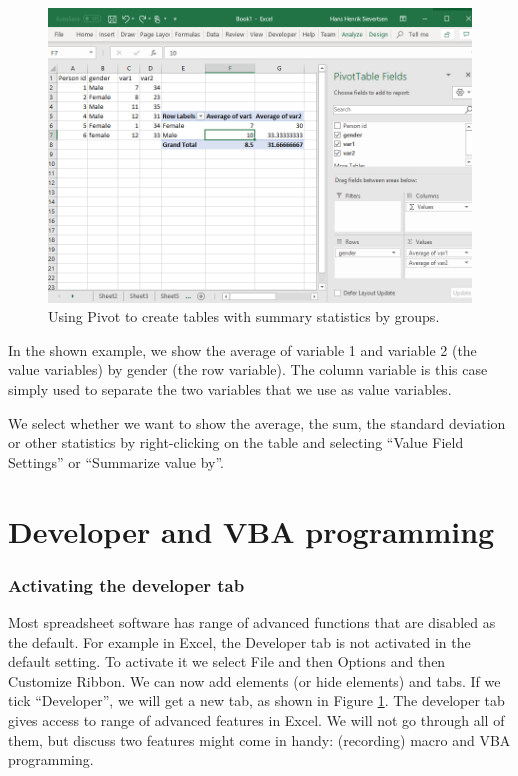 \documentclass[]{book}
\begin{document}
\begin{figure}

{\centering \includegraphics[width=0.8\linewidth]{_resources/chapter_advexc/6} 

}

\caption{Using Pivot to create tables with summary statistics by groups.}\label{fig:advex7}
\end{figure}

In the shown example, we show the average of variable 1 and variable 2 (the value variables) by gender (the row variable). The column variable is this case simply used to separate the two variables that we use as value variables.

We select whether we want to show the average, the sum, the standard deviation or other statistics by right-clicking on the table and selecting ``Value Field Settings'' or ``Summarize value by''.

\hypertarget{developer-and-vba-programming}{%
\section{Developer and VBA programming}\label{developer-and-vba-programming}}

\hypertarget{activating-the-developer-tab}{%
\subsubsection*{Activating the developer tab}\label{activating-the-developer-tab}}

Most spreadsheet software has range of advanced functions that are disabled as the default. For example in Excel, the Developer tab is not activated in the default setting. To activate it we select File and then Options and then Customize Ribbon. We can now add elements (or hide elements) and tabs. If we tick ``Developer'', we will get a new tab, as shown in Figure \ref{fig:advex7}. The developer tab gives access to range of advanced features in Excel. We will not go through all of them, but discuss two features might come in handy: (recording) macro and VBA programming.
\end{document}
